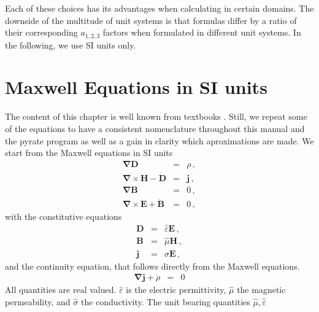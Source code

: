 \documentclass[12pt,a4paper,twoside,openright,BCOR10mm,headsepline,titlepage,abstracton,chapterprefix,final]{scrreprt}
\newcommand\Vector[1]{{\mathbf{#1}}}
\newcommand\Nabla{\Vector{\nabla}}
\newcommand\timederivative[1]{\dot{{#1}}}
\newcommand\Tensor[1]{\hat{#1}}
\newcommand\scalarEfield{E}
\newcommand\scalarBfield{B}
\newcommand\scalarHfield{H}
\newcommand\scalarDfield{D}
\newcommand\Efield{\Vector{\scalarEfield}}
\newcommand\Bfield{\Vector{\scalarBfield}}
\newcommand\Hfield{\Vector{\scalarHfield}}
\newcommand\Dfield{\Vector{\scalarDfield}}
\newcommand\permeability{\Tensor{\scalarpermeability}}
\newcommand\scalarpermeability{\mu}
\newcommand\permittivity{\Tensor{\scalarpermittivity}}
\newcommand\scalarpermittivity{\varepsilon}
\newcommand\conductivity{\Tensor{\sigma}}
\newcommand\currentdensity{\Vector{j}}
\newcommand\chargedensity{\rho}
\begin{document}
Each of these choices has its advantages when calculating in certain domains.
The downside of the multitude of unit systems is that formulas differ by 
a ratio of their corresponding $a_{1,2,3}$ factors when formulated in different unit systems.
In the following, we use SI units only.

\section{Maxwell Equations in SI units}
The content of this chapter is well known from textbooks \cite{Jackson, BornWolf}. Still, we repeat some of the equations to have a consistent 
nomenclature throughout this manual and the pyrate program as well as a gain in clarity which aproximations are made.
We start from the Maxwell equations in SI units
\begin{subequations}\label{eq:Maxwell}
\begin{eqnarray}
  \Nabla \Dfield &=& \chargedensity\,, 							\label{eq:MaxwellNablaD}\\
  \Nabla \times \Hfield -\timederivative{\Dfield} &=&  \currentdensity\,,  		\label{eq:MaxwellNablaCrossH} \\
  \Nabla \Bfield &=& 0\,,  									\label{eq:MaxwellNablaB} \\
  \Nabla \times \Efield + \timederivative{\Bfield} &=& 0\,,   					\label{eq:MaxwellNablaCrossE}
\end{eqnarray}
\end{subequations}
with the constitutive equations
\begin{subequations}\label{eq:Material}
\begin{eqnarray}
  \Dfield &=& \permittivity \Efield\,, 								\label{eq:ConstitutiveEpsilon}\\
  \Bfield &=& \permeability \Hfield\,, 								\label{eq:ConstitutiveMu}\\
  \currentdensity &=& \conductivity \Efield\,,						\label{eq:ConstitutiveSigma}
\end{eqnarray}
\end{subequations}
and the continuity equation, that follows directly from the Maxwell equations.
\begin{eqnarray}
  \Nabla \currentdensity + \timederivative{\chargedensity} &=& 0		\label{eq:continuity}
\end{eqnarray}
All quantities are real valued. $\permittivity$ is the  electric  permittivity, 
$\permeability$ the magnetic permeability, 
and $\conductivity$ the conductivity.
The unit bearing quantities $\permeability, \permittivity$ 
\end{document}
